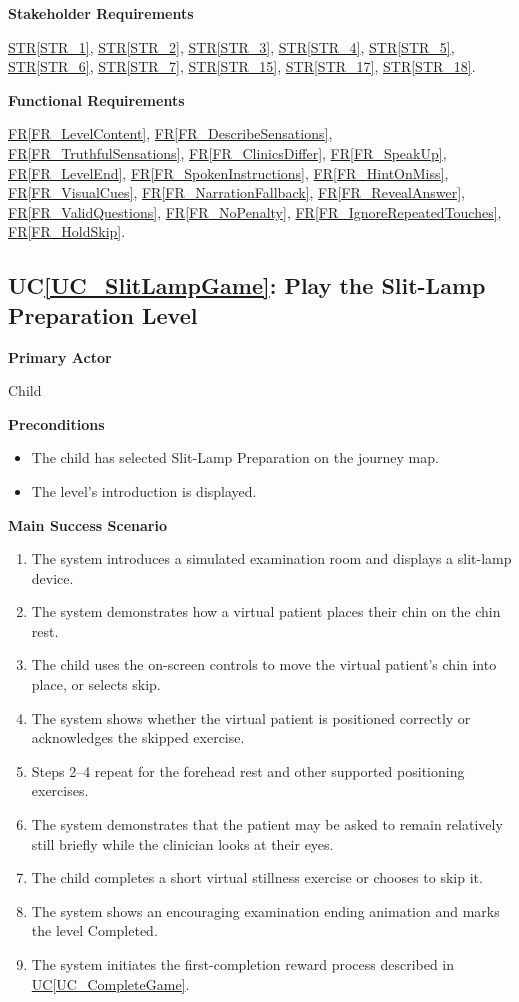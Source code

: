 \documentclass[10pt]{article}
\newcommand{\strref}[1]{\hyperref[#1]{STR\ref*{#1}}}
\newcounter{ucnum} %
\newcommand{\ucref}[1]{\hyperref[#1]{UC\ref*{#1}}}
\newcommand{\ucheading}[1]{UC\ref*{#1}}
\newcommand{\rref}[1]{\hyperref[#1]{FR\ref*{#1}}}
\begin{document}
\textbf{Stakeholder Requirements}

\strref{STR_1}, \strref{STR_2}, \strref{STR_3}, \strref{STR_4}, \strref{STR_5}, \strref{STR_6}, \strref{STR_7}, \strref{STR_15}, \strref{STR_17}, \strref{STR_18}.

\textbf{Functional Requirements}

\rref{FR_LevelContent}, \rref{FR_DescribeSensations}, \rref{FR_TruthfulSensations}, \rref{FR_ClinicsDiffer}, \rref{FR_SpeakUp}, \rref{FR_LevelEnd}, \rref{FR_SpokenInstructions}, \rref{FR_HintOnMiss}, \rref{FR_VisualCues}, \rref{FR_NarrationFallback}, \rref{FR_RevealAnswer}, \rref{FR_ValidQuestions}, \rref{FR_NoPenalty}, \rref{FR_IgnoreRepeatedTouches}, \rref{FR_HoldSkip}.

\label{UC_SlitLampGame}
\subsection{\ucheading{UC_SlitLampGame}: Play the Slit-Lamp Preparation Level}

\textbf{Primary Actor}

Child

\textbf{Preconditions}
\begin{itemize}
    \item The child has selected Slit-Lamp Preparation on the journey map.
    \item The level's introduction is displayed.
\end{itemize}

\textbf{Main Success Scenario}
\begin{enumerate}
    \item The system introduces a simulated examination room and
    displays a slit-lamp device.
    \item The system demonstrates how a virtual patient places
    their chin on the chin rest.
    \item The child uses the on-screen controls to move the
    virtual patient's chin into place, or selects skip.
    \item The system shows whether the virtual patient is positioned
    correctly or acknowledges the skipped exercise.
    \item Steps 2--4 repeat for the forehead rest and other
    supported positioning exercises.
    \item The system demonstrates that the patient may be asked
    to remain relatively still briefly while the clinician looks
    at their eyes.
    \item The child completes a short virtual stillness exercise
    or chooses to skip it.
    \item The system shows an encouraging examination ending
    animation and marks the level Completed.
    \item The system initiates the first-completion reward process
    described in \ucref{UC_CompleteGame}.
\end{enumerate}
\end{document}
